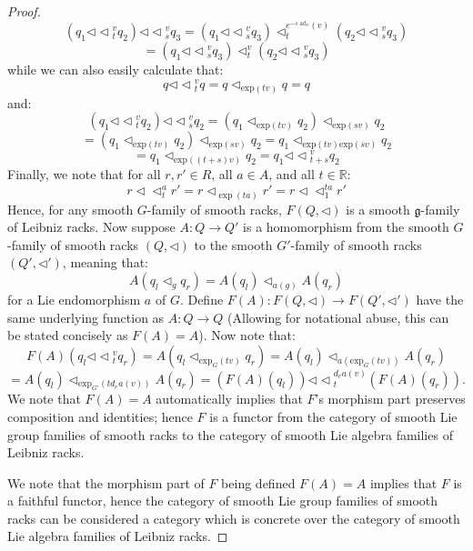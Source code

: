 \documentclass[12pt]{amsart}
\theoremstyle{plain}
\theoremstyle{definition}
\begin{document}
\begin{proof}
$$ (q_1 {\triangleleft\!\!\triangleleft}_t^v q_2 ){\triangleleft\!\!\triangleleft}_s^v q_3 = (q_1{\triangleleft\!\!\triangleleft}^v_s q_3) \triangleleft_{t   }^{e^{-s \; \text{ad}_v}(v)} (q_2 {\triangleleft\!\!\triangleleft}^v_s q_3 )  $$ $$= (q_1{\triangleleft\!\!\triangleleft}^v_s q_3) \triangleleft_{t   }^{ v} (q_2 {\triangleleft\!\!\triangleleft}^v_s q_3 )  $$
while we can also easily calculate that:
$$  q  {\triangleleft\!\!\triangleleft}_t^v q = q \triangleleft_{\text{exp}(tv)}  q  = q$$
and:
$$ (q_1 {\triangleleft\!\!\triangleleft}_t^v q_2){\triangleleft\!\!\triangleleft}_s^v q_2 =(q_1 \triangleleft_{\text{exp}(tv)}  q_2)\triangleleft_{\text{exp}(sv)}  q_2 $$
$$=(q_1 \triangleleft_{\text{exp}(tv)}  q_2)\triangleleft_{\text{exp}(sv)}  q_2 = q_1 \triangleleft_{\text{exp}(tv)\text{exp}(sv)} q_2   $$
$$ =  q_1 \triangleleft_{\text{exp}((t+s)v)} q_2 = q_1{\triangleleft\!\!\triangleleft}_{t+s}^v q_2 $$
Finally, we note that for all $r,r' \in R$, all $a \in A$, and all $t \in \mathbb{R}$:
$$ r \triangleleft \!\! \triangleleft_t^a r' = r \triangleleft_{\exp(ta)}r' = r \triangleleft \!\! \triangleleft_1^{ta} r'   $$
Hence, for any smooth $G$-family of smooth racks, $F(Q,\triangleleft)$ is a smooth $\mathfrak{g}$-family of Leibniz racks. Now suppose $A:Q \to Q'$ is a homomorphism from the smooth $G$-family of smooth racks $(Q,\triangleleft)$ to the smooth $G'$-family of smooth racks $(Q',\triangleleft')$, meaning that:
$$ A(q_l\triangleleft_g q_r) = A(q_l) \triangleleft_{a(g)} A(q_r) $$
for a Lie endomorphism $a$ of $G$. Define $F(A):F(Q,\triangleleft) \to F(Q',\triangleleft')$ have the same underlying function as $A:Q \to Q$ (Allowing for notational abuse, this can be stated concisely as $F(A) =A$). Now note that:
$$ F(A)(q_l {\triangleleft\!\!\triangleleft}_t^v q_r) = A(q_l \triangleleft_{\text{exp}_G(tv)} q_r ) = A(q_l) \triangleleft_{a(\text{exp}_G(tv))} A(q_r) $$ $$= A(q_l) \triangleleft_{\text{exp}_{G'}(td_ea(v))} A(q_r) =  (F(A)(q_l)) {\triangleleft\!\!\triangleleft}_{t}^{d_ea(v)} (F(A)(q_r)). $$
We note that $F(A)=A$ automatically implies that $F$'s morphism part preserves composition and identities; hence $F$ is a functor from the category of smooth Lie group families of smooth racks to the category of smooth Lie algebra families of Leibniz racks.

We note that the morphism part of $F$ being defined $F(A) =A$ implies that $F$ is a faithful functor, hence the category of smooth Lie group families of smooth racks can be considered a category which is concrete over the category of smooth Lie algebra families of Leibniz racks. 






\end{proof}
\end{document}
